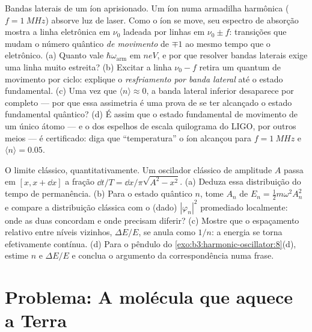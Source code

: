 \begin{exercise}[$\star\star\star$]\label{exo:b3:harmonic-oscillator:11}
Bandas laterais de um íon aprisionado. Um íon numa armadilha harmônica ($f =
\qty{1}{MHz}$) absorve luz de laser. Como o íon se move, seu
espectro de absorção mostra a linha eletrônica em $\nu_0$ ladeada por
linhas em $\nu_0 \pm f$: transições que mudam o número quântico
\emph{de movimento} de $\mp1$ ao mesmo tempo que o eletrônico. (a)
Quanto vale $\hbar\omega_{\text{arm}}$ em $\unit{neV}$, e por que
resolver bandas laterais exige uma linha muito estreita? (b) Excitar a
linha $\nu_0 - f$ retira um quantum de movimento por ciclo: explique o
\emph{resfriamento por banda lateral} até o estado fundamental. (c) Uma
vez que $\langle n\rangle \approx
0$, a banda lateral inferior desaparece por completo --- por que essa
assimetria é uma prova de se ter alcançado o estado fundamental
quântico? (d) É assim que o estado fundamental de movimento de um único
átomo --- e o dos espelhos de escala quilograma do LIGO, por outros
meios --- é certificado: diga que ``temperatura'' o íon alcançou para
$f = \qty{1}{MHz}$ e $\langle n\rangle = 0.05$.
\end{exercise}

\begin{exercise}[$\star\star\star$]\label{exo:b3:harmonic-oscillator:12}
O limite clássico, quantitativamente. Um oscilador clássico de
amplitude $A$ passa em $[x, x + \dd x]$ a fração $\dd
t/T = \dd x/\pi\sqrt{A^2 - x^2}$. (a) Deduza essa distribuição do
tempo de permanência. (b) Para o estado quântico $n$, tome $A_n$ de $E_n =
\tfrac12 m\omega^2A_n^2$ e compare a distribuição clássica com o
(dado) $|\varphi_n|^2$ promediado localmente: onde as duas concordam e
onde precisam diferir? (c) Mostre que o espaçamento relativo entre
níveis vizinhos, $\Delta E/E$, se anula como $1/n$: a energia se torna
efetivamente contínua. (d) Para o pêndulo do
\cref{exo:b3:harmonic-oscillator:8}(d), estime $n$ e $\Delta
E/E$ e conclua o argumento da correspondência numa frase.
\end{exercise}

\section{Problema: A molécula que aquece a Terra}

